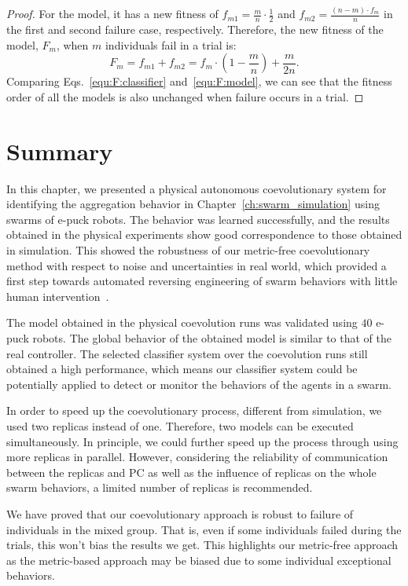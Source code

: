 \begin{proof}
For the model, it has a new fitness of $f_{m1} = \frac{m}{n} \cdot \frac{1}{2}$ and $f_{m2} = \frac{(n-m) \cdot f_m}{n}$ in the first and second failure case, respectively. Therefore, the new fitness of the model, $F_m$, when $m$ individuals fail in a trial is:
\begin{equation}\label{equ:F:model}
{F_m} = f_{m1} + f_{m2} = f_m \cdot (1-\frac{m}{n}) + \frac{m}{2n}.
\end{equation}
Comparing Eqs.~\eqref{equ:F:classifier} and~\eqref{equ:F:model}, we can see that the fitness order of all the models is also unchanged when failure occurs in a trial.
\end{proof}

\section{Summary}\label{sec:summary_swarm_physical}

In this chapter, we presented a physical autonomous coevolutionary system for identifying the aggregation behavior in Chapter~\ref{ch:swarm_simulation} using swarms of e-puck robots. The behavior was learned successfully, and the results obtained in the physical experiments show good correspondence to those obtained in simulation. This showed the robustness of our metric-free coevolutionary method with respect to noise and uncertainties in real world, which provided a first step towards automated reversing engineering of  swarm behaviors with little human intervention~\cite{King2009, Schmidt2009}. 

The model obtained in the physical coevolution runs was validated using $40$ e-puck robots. The global behavior of the obtained model is similar to that of the real controller. The selected classifier system over the coevolution runs still obtained a high performance, which means our classifier system could be potentially applied to detect or monitor the behaviors of the agents in a swarm. 

In order to speed up the coevolutionary process, different from simulation, we used two replicas instead of one. Therefore, two models can be executed simultaneously. In principle, we could further speed up the process through using more replicas in parallel. However, considering the reliability of communication between the replicas and PC as well as the influence of replicas on the whole swarm behaviors, a limited number of replicas is recommended. 

We have proved that our coevolutionary approach is robust to failure of individuals in the mixed group. That is, even if some individuals failed during the trials, this won't bias the results we get. This highlights our metric-free approach as the metric-based approach may be biased due to some individual exceptional behaviors.


